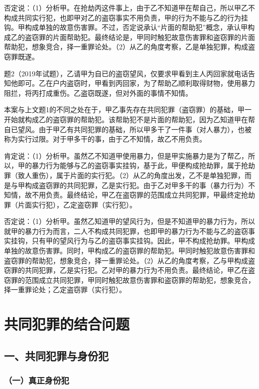 否定说：（1）分析甲。在抢劫丙这件事上，由于乙不知道甲在帮自己，所以甲乙不构成共同实行犯，也即甲对乙的盗窃事实不用负责，甲的行为不能与乙的行为挂钩。甲构成单独的故意伤害罪。不过，否定说承认“片面的帮助犯”概念，承认甲构成乙的盗窃罪的片面帮助犯。最终结论是，甲同时触犯故意伤害罪和盗窃罪的片面帮助犯，想象竞合，择一重罪论处。（2）从乙的角度考察，乙是单独犯罪，构成盗窃罪既遂。

题2（2019年试题），乙请甲为自已的盗窃望风，仅要求甲看到主人丙回家就电话告知他即可。乙在户内盗窃时，甲看到丙回家，为了帮助乙顺利取得财物，使用暴力阻拦，将丙打成重伤。乙盗窃既遂，但对外面的事情不知情。

本案与上文题1的不同之处在于，甲乙事先存在共同犯罪（盗窃罪）的基础，甲一开始就构成乙的盗窃罪的帮助犯。该帮助犯不是片面的帮助犯，因为乙知道甲在帮自已望风。由于甲乙有共同犯罪的基础，所以甲多干了一件事（对人暴力），也被称为实行过限。对于甲多干的事，由于乙不知情，故乙不用负责。

肯定说：（1）分析甲。虽然乙不知道甲使用暴力，但是甲实施暴力是为了帮乙，所以，甲的暴力行为能够与乙的盗窃事实挂钩，基于此，甲便构成抢劫罪，属于抢劫罪（致人重伤），属于片面的实行犯。（2）从乙的角度出发，乙不是单独犯罪，而是与甲构成盗窃罪的共同犯罪，乙是实行犯。由于乙对甲多干的事（暴力行为）不知情，故不用负责。最终结论，甲乙在盗窃罪的范围成立共同犯罪，甲最终定抢劫罪（片面实行犯），乙定盗窃罪（实行犯）。

否定说：（1）分析甲。虽然乙知道甲的望风行为，但是不知道甲的暴力行为，所以就甲的暴力行为而言，二人不构成共同犯罪，也即甲的暴力行为不能与乙的盗窃事实挂钩，只有甲的望风行为与乙的盗窃事实挂钩。因此，甲不构成抢劫罪。甲构成单独的故意伤害罪。同时，甲构成乙的盗窃罪的帮助犯。甲同时触犯故意伤害罪和盗窃罪的帮助犯，想象竞合，择一重罪论处。（2）从乙的角度考察，乙与甲构成盗窃罪的共同犯罪，乙是实行犯。乙对甲的暴力行为不用负责。最终结论，甲乙在盗窃罪的范围成立共同犯罪，甲同时触犯故意伤害罪和盗窃罪的帮助犯，想象竞合，择一重罪论处；乙定盗窃罪（实行犯）。

\section{共同犯罪的结合问题}

\subsection*{一、共同犯罪与身份犯}

\subsubsection*{（一）真正身份犯}

